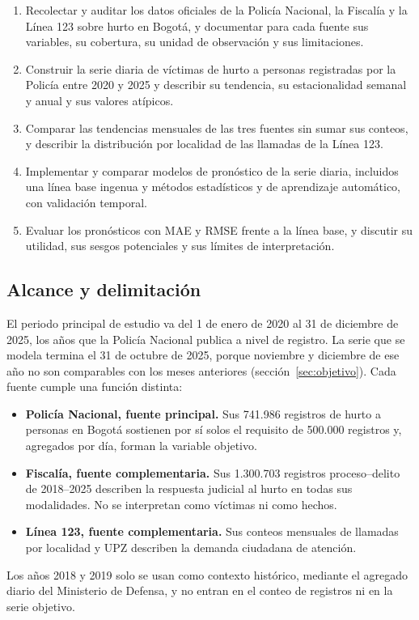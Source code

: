 \begin{enumerate}
  \item Recolectar y auditar los datos oficiales de la Policía Nacional, la Fiscalía y la Línea 123 sobre hurto en Bogotá, y documentar para cada fuente sus variables, su cobertura, su unidad de observación y sus limitaciones.
  \item Construir la serie diaria de víctimas de hurto a personas registradas por la Policía entre 2020 y 2025 y describir su tendencia, su estacionalidad semanal y anual y sus valores atípicos.
  \item Comparar las tendencias mensuales de las tres fuentes sin sumar sus conteos, y describir la distribución por localidad de las llamadas de la Línea 123.
  \item Implementar y comparar modelos de pronóstico de la serie diaria, incluidos una línea base ingenua y métodos estadísticos y de aprendizaje automático, con validación temporal.
  \item Evaluar los pronósticos con MAE y RMSE frente a la línea base, y discutir su utilidad, sus sesgos potenciales y sus límites de interpretación.
\end{enumerate}

\subsection{Alcance y delimitación}

El periodo principal de estudio va del 1 de enero de 2020 al 31 de diciembre de 2025, los años que la Policía Nacional publica a nivel de registro. La serie que se modela termina el 31 de octubre de 2025, porque noviembre y diciembre de ese año no son comparables con los meses anteriores (sección~\ref{sec:objetivo}). Cada fuente cumple una función distinta:
\begin{itemize}
  \item \textbf{Policía Nacional, fuente principal.} Sus 741.986 registros de hurto a personas en Bogotá sostienen por sí solos el requisito de 500.000 registros y, agregados por día, forman la variable objetivo.
  \item \textbf{Fiscalía, fuente complementaria.} Sus 1.300.703 registros proceso--delito de 2018--2025 describen la respuesta judicial al hurto en todas sus modalidades. No se interpretan como víctimas ni como hechos.
  \item \textbf{Línea 123, fuente complementaria.} Sus conteos mensuales de llamadas por localidad y UPZ describen la demanda ciudadana de atención.
\end{itemize}
Los años 2018 y 2019 solo se usan como contexto histórico, mediante el agregado diario del Ministerio de Defensa, y no entran en el conteo de registros ni en la serie objetivo.

